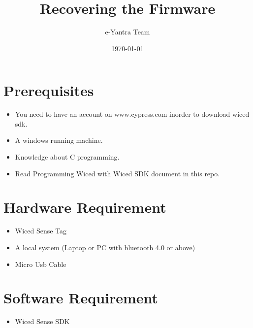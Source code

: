 \documentclass[11pt,a4paper]{article}
\begin{document}
\begin{titlepage}
\title{Recovering the Firmware}
\author{e-Yantra Team}
\date{\today}
\maketitle
\end{titlepage}
 \tableofcontents
 
 
 \newpage
	\section{Prerequisites}
	\begin{itemize}
	\item You need to have an account on www.cypress.com inorder to download wiced sdk.
	\item A windows running machine.
	\item Knowledge about C programming.
	\item Read Programming Wiced with Wiced SDK document in this repo.
	\end{itemize}
	
	\section{Hardware Requirement}
	\begin{itemize}
	\item Wiced Sense Tag
	\item A local system (Laptop or PC with bluetooth 4.0 or above)
	\item Micro Usb Cable
	\end{itemize}
	
	\section{Software Requirement}
	\begin{itemize}
	\item Wiced Sense SDK
	\end{itemize}
	
	
\newpage
\end{document}
